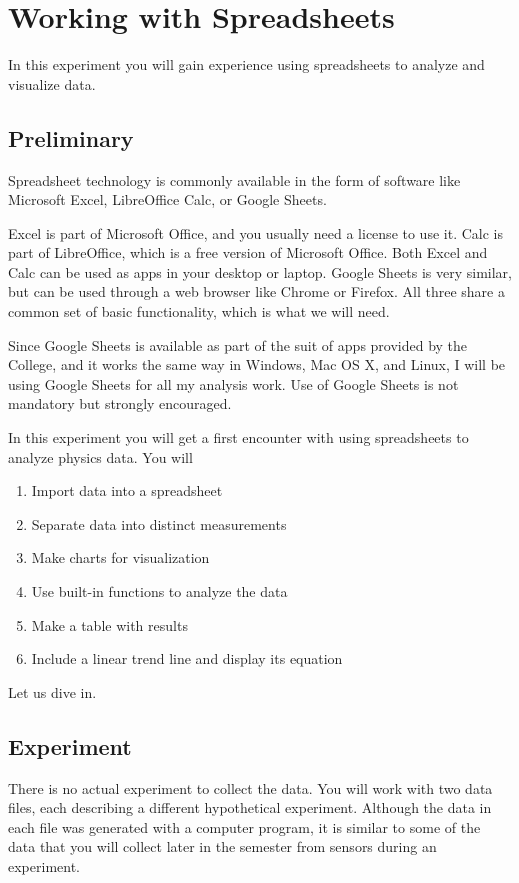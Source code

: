 \chapter{Working with Spreadsheets}
In this experiment you will gain experience using spreadsheets to analyze and visualize data.
\section{Preliminary}
Spreadsheet technology is commonly available in the form of software like Microsoft Excel, LibreOffice Calc, or Google Sheets.

Excel is part of Microsoft Office, and you usually need a license to use it. Calc is part of LibreOffice, which is a free version of Microsoft Office. Both Excel and Calc can be used as apps in your desktop or laptop. Google Sheets is very similar, but can be used through a web browser like Chrome or Firefox. All three share a common set of basic functionality, which is what we will need.

Since Google Sheets is available as part of the suit of apps provided by the College, and it works the same way in Windows, Mac OS X, and Linux, I will be using Google Sheets for all my analysis work. Use of Google Sheets is not mandatory but strongly encouraged.

In this experiment you will get a first encounter with using spreadsheets to analyze physics data. You will
\begin{enumerate}
    \item Import data into a spreadsheet
    \item Separate data into distinct measurements
    \item Make charts for visualization
    \item Use built-in functions to analyze the data
    \item Make a table with results
    \item Include a linear trend line and display its equation
\end{enumerate}
Let us dive in.
\section{Experiment}
There is no actual experiment to collect the data. You will work with two data files, each describing a different hypothetical experiment. Although the data in each file was generated with a computer program, it is similar to some of the data that you will collect later in the semester from sensors during an experiment.
